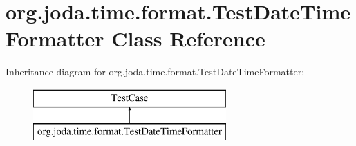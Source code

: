 \hypertarget{classorg_1_1joda_1_1time_1_1format_1_1_test_date_time_formatter}{\section{org.\-joda.\-time.\-format.\-Test\-Date\-Time\-Formatter Class Reference}
\label{classorg_1_1joda_1_1time_1_1format_1_1_test_date_time_formatter}
}
Inheritance diagram for org.\-joda.\-time.\-format.\-Test\-Date\-Time\-Formatter\-:\begin{figure}[H]
\begin{center}
\leavevmode
\includegraphics[height=2.000000cm]{classorg_1_1joda_1_1time_1_1format_1_1_test_date_time_formatter}
\end{center}
\end{figure}
